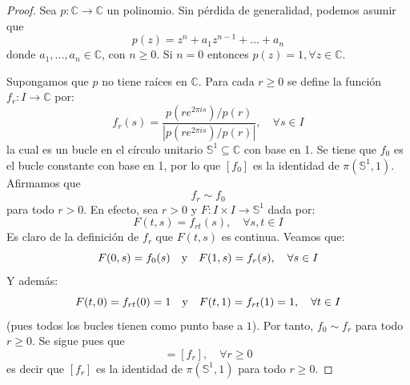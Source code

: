 \documentclass[12pt]{report}
\theoremstyle{largebreak}
\newcommand\abs[1]{\ensuremath{\left|#1\right|}}
\newcommand\cf[3]{\ensuremath{#1:#2\rightarrow#3}}
\begin{document}
    \begin{proof}
        Sea $\cf{p}{\mathbb{C}}{\mathbb{C}}$ un polinomio. Sin pérdida de generalidad, podemos asumir que
        \begin{equation*}
            p(z)=z^{ n}+a_1z^{ n-1}+...+a_n
        \end{equation*}
        donde $a_1,...,a_n\in\mathbb{C}$, con $n\geq0$. Si $n=0$ entonces $p(z)=1,\forall z\in\mathbb{C}$.

        Supongamos que $p$ no tiene raíces en $\mathbb{C}$. Para cada $r\geq 0$ se define la función $\cf{f_r}{I}{\mathbb{C}}$ por:
        \begin{equation*}
            f_r(s)=\frac{p(re^{ 2\pi is})/p(r)}{\abs{p(re^{ 2\pi is})/p(r)}},\quad\forall s\in I
        \end{equation*}
        la cual es un bucle en el círculo unitario $\mathbb{S}^1\subseteq\mathbb{C}$ con base en 1. Se tiene que $f_0$ es el bucle constante con base en 1, por lo que $[f_0]$ es la identidad de $\pi(\mathbb{S}^1,1)$. Afirmamos que
        \begin{equation*}
            f_r\sim f_0
        \end{equation*}
        para todo $r>0$. En efecto, sea $r>0$ y $\cf{F}{I\times I}{\mathbb{S}^1}$ dada por:
        \begin{equation*}
            F(t,s)=f_{ rt}(s),\quad\forall  s,t\in I
        \end{equation*}
        Es claro de la definición de $f_r$ que $F(t,s)$ es continua. Veamos que:
        \begin{equation*}
            F(0,s)=f_0(s)\quad\textup{y}\quad F(1,s)=f_r(s),\quad\forall s\in I
        \end{equation*}
        Y además:
        \begin{equation*}
            F(t,0)=f_{ rt}(0)=1\quad\textup{y}\quad F(t,1)=f_{ rt}(1)=1,\quad\forall t\in I
        \end{equation*}
        (pues todos los bucles tienen como punto base a $1$). Por tanto, $f_0\sim f_r$ para todo $r\geq0$. Se sigue pues que
        \begin{equation*}
            [f_0]=[f_r],\quad\forall r\geq0
        \end{equation*}
        es decir que $[f_r]$ es la identidad de $\pi(\mathbb{S}^1,1)$ para todo $r\geq0$.


\end{proof}
\end{document}
